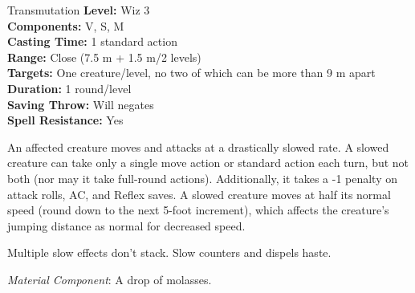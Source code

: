 {Transmutation}
{
	\textbf{Level:}
	Wiz 3\\
	\textbf{Components:}
	V, S, M\\
	\textbf{Casting Time:}
	1 standard action\\
	\textbf{Range:}
	Close (7.5 m + 1.5 m/2 levels)\\
	\textbf{Targets:}
	One creature/level, no two of which can be more than 9 m apart\\
	\textbf{Duration:}
	1 round/level\\
	\textbf{Saving Throw:}
	Will negates\\
	\textbf{Spell Resistance:}
	Yes\\
}
{
	An affected creature moves and attacks at a drastically slowed rate. A slowed creature can take only a single move action or standard action each turn, but not both (nor may it take full-round actions). Additionally, it takes a -1 penalty on attack rolls, AC, and Reflex saves. A slowed creature moves at half its normal speed (round down to the next 5-foot increment), which affects the creature's jumping distance as normal for decreased speed.

	Multiple slow effects don't stack. Slow counters and dispels haste.

	\textit{Material Component}:
	A drop of molasses.

}
